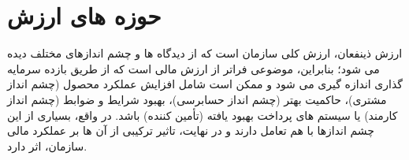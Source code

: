 \documentclass[14pt]{article}
\begin{document}
 
\section{حوزه های ارزش}

ارزش ذینفعان، ارزش کلی سازمان است که از دیدگاه ها و چشم اندازهای مختلف دیده می شود؛ بنابراین، موضوعی فراتر از ارزش مالی است که از طریق بازده سرمایه گذاری اندازه گیری می شود و ممکن است شامل افزایش عملکرد محصول (چشم انداز مشتری)، حاکمیت بهتر (چشم انداز حسابرسی)، بهبود شرایط و ضوابط (چشم انداز کارمند) یا سیستم های پرداخت بهبود یافته (تأمین کننده) باشد. در واقع، بسیاری از این چشم اندازها با هم تعامل دارند و در نهایت، تاثیر ترکیبی از آن ها بر عملکرد مالی سازمان، اثر دارد.
\end{document}
